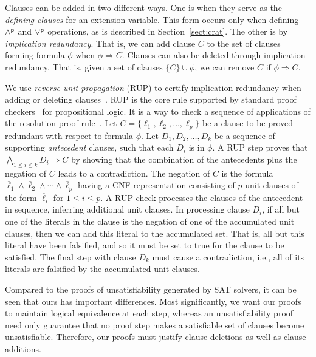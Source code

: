 \documentclass[letterpaper,USenglish,cleveref, autoref, thm-restate]{lipics-v2021}
\newcommand{\pand}{\mathbin{\land^{\sf p}}}
\newcommand{\por}{\mathbin{\lor^{\sf p}}}
\newcommand{\obar}[1]{\overline{#1}}
\newcommand{\lit}{\ell}
\newcommand{\imply}{\Rightarrow}
\begin{document}
Clauses can be added in two different ways.  One is when they serve as
the {\em defining clauses} for an extension variable.  This form
occurs only when defining $\pand$ and $\por$ operations, as is
described in Section~\ref{sect:crat}.  The other is by {\em
  implication redundancy}.  That is, we can add clause $C$ to the set
of clauses forming formula $\phi$ when $\phi \imply C$.  Clauses can
also be deleted through implication redundancy.  That is, given a set
of clauses $\{C\} \cup \phi$, we can remove $C$ if $\phi \imply C$.

We use {\em reverse unit propagation} (RUP) to certify
implication redundancy when adding or deleting
clauses~\cite{goldberg,vangelder08_verifying_rup_proofs}.
RUP
is the core rule supported by standard
proof checkers~\cite{RAT,wetzler14_drattrim} for propositional logic.
It is a way to check a sequence of applications of the resolution proof rule~\cite{robinson-1965}.
Let $C = \{\lit_1, \lit_2, \ldots,\lit_p\}$ be a clause to be
proved redundant with respect to formula $\phi$.  Let $D_1, D_2, \ldots, D_k$ be a sequence of supporting
{\em antecedent} clauses, such that each $D_i$ is in $\phi$.
A RUP step
proves that $\bigwedge_{1\leq i \leq k} D_i \imply C$ by showing
that the combination of the antecedents plus the negation of $C$ leads
to a contradiction.  The negation of $C$ is the formula
$\overline{\lit}_1 \land \overline{\lit}_2 \land \cdots \land
\overline{\lit}_p$ having a CNF representation consisting of $p$ unit
clauses of the form $\obar{\lit}_i$ for $1 \leq i \leq p$.  A RUP
check processes the clauses of the antecedent in sequence, inferring
additional unit clauses.  In processing clause $D_i$, if all but one
of the literals in the clause is the negation of one of the
accumulated unit clauses, then we can add this literal to the
accumulated set.  That is, all but this literal have been falsified,
and so it must be set to true for the clause to be satisfied.  The
final step with clause $D_k$ must cause a contradiction, i.e., all of
its literals are falsified by the accumulated unit clauses.

Compared to the proofs of unsatisfiability generated by SAT solvers,
it can be seen that ours has important differences.  Most
significantly, we want our proofs to maintain logical equivalence at
each step, whereas an unsatisfiability proof need only guarantee that
no proof step makes a satisfiable set of clauses become
unsatisfiable.  Therefore, our proofs must justify clause deletions as well as clause additions.
\end{document}
